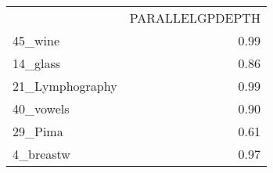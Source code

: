 \begin{tabular}{lr}
 & PARALLELGPDEPTH \\
45_wine & 0.99 \\
14_glass & 0.86 \\
21_Lymphography & 0.99 \\
40_vowels & 0.90 \\
29_Pima & 0.61 \\
4_breastw & 0.97 \\
\end{tabular}
